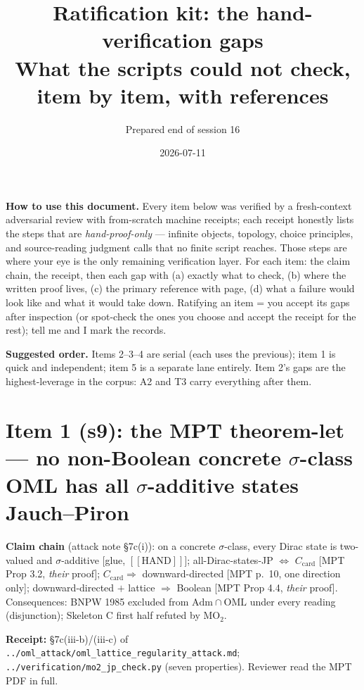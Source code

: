 \documentclass[11pt]{article}
\title{Ratification kit: the hand-verification gaps\\
\large What the scripts could not check, item by item, with references}
\author{Prepared end of session 16}
\date{2026-07-11}
\newcommand{\HAND}{\ensuremath{[\![\text{HAND}]\!]}}
\newcommand{\file}[1]{\texttt{\small #1}}
\begin{document}
\maketitle

\noindent\textbf{How to use this document.} Every item below was
verified by a fresh-context adversarial review with from-scratch
machine receipts; each receipt honestly lists the steps that are
\emph{hand-proof-only} --- infinite objects, topology, choice
principles, and source-reading judgment calls that no finite script
reaches. Those steps are where your eye is the only remaining
verification layer. For each item: the claim chain, the receipt, then
each gap with (a) exactly what to check, (b) where the written proof
lives, (c) the primary reference with page, (d) what a failure would
look like and what it would take down. Ratifying an item = you accept
its gaps after inspection (or spot-check the ones you choose and
accept the receipt for the rest); tell me and I mark the records.

\smallskip
\noindent\textbf{Suggested order.} Items 2--3--4 are serial (each uses
the previous); item 1 is quick and independent; item 5 is a separate
lane entirely. Item 2's gaps are the highest-leverage in the corpus:
A2 and T3 carry everything after them.

\tableofcontents

\section{Item 1 (s9): the MPT theorem-let --- no non-Boolean concrete
$\sigma$-class OML has all $\sigma$-additive states Jauch--Piron}

\noindent\textbf{Claim chain} (attack note \S7c(i)):
on a concrete $\sigma$-class, every Dirac state is two-valued and
$\sigma$-additive [glue, \HAND]; all-Dirac-states-JP
$\Leftrightarrow$ $C_{\mathrm{card}}$ [MPT Prop 3.2, \emph{their}
proof]; $C_{\mathrm{card}} \Rightarrow$ downward-directed [MPT p.~10,
one direction only]; downward-directed $+$ lattice $\Rightarrow$
Boolean [MPT Prop 4.4, \emph{their} proof]. Consequences: BNPW 1985
excluded from $\mathrm{Adm}\cap\mathrm{OML}$ under every reading
(disjunction); Skeleton C first half refuted by MO$_2$.

\noindent\textbf{Receipt:} \S7c(iii-b)/(iii-c) of
\file{../oml\_attack/oml\_lattice\_regularity\_attack.md};
\file{../verification/mo2\_jp\_check.py} (seven properties). Reviewer
read the MPT PDF in full.
\end{document}
